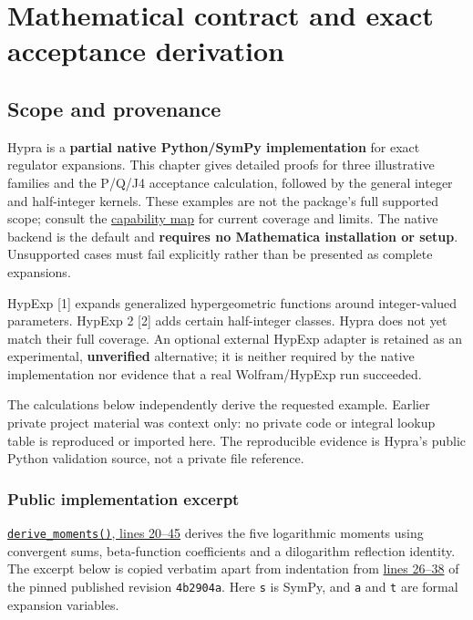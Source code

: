 \documentclass[
  11pt,
]{article}
\author{}
\date{}
\begin{document}
\section{Mathematical contract and exact acceptance
derivation}\label{mathematical-contract-and-exact-acceptance-derivation}

\subsection{Scope and provenance}\label{scope-and-provenance}

Hypra is a \textbf{partial native Python/SymPy implementation} for exact
regulator expansions. This chapter gives detailed proofs for three
illustrative families and the P/Q/J4 acceptance calculation, followed by
the general integer and half-integer kernels. These examples are not the
package's full supported scope; consult the \href{scope.md}{capability
map} for current coverage and limits. The native backend is the default
and \textbf{requires no Mathematica installation or setup}. Unsupported
cases must fail explicitly rather than be presented as complete
expansions.

HypExp {[}1{]} expands generalized hypergeometric functions around
integer-valued parameters. HypExp 2 {[}2{]} adds certain half-integer
classes. Hypra does not yet match their full coverage. An optional
external HypExp adapter is retained as an experimental,
\textbf{unverified} alternative; it is neither required by the native
implementation nor evidence that a real Wolfram/HypExp run succeeded.

The calculations below independently derive the requested example.
Earlier private project material was context only: no private code or
integral lookup table is reproduced or imported here. The reproducible
evidence is Hypra's public Python validation source, not a private file
reference.

\subsubsection{Public implementation
excerpt}\label{public-implementation-excerpt}

\href{https://github.com/lalmei/hypra/blob/4b2904aa1163f9e47f2f497cd0b9a9be5c719b59/scripts/validate_integral.py\#L20-L45}{\texttt{derive\_moments()},
lines 20--45} derives the five logarithmic moments using convergent
sums, beta-function coefficients and a dilogarithm reflection identity.
The excerpt below is copied verbatim apart from indentation from
\href{https://github.com/lalmei/hypra/blob/4b2904aa1163f9e47f2f497cd0b9a9be5c719b59/scripts/validate_integral.py\#L26-L38}{lines
26--38} of the pinned published revision \texttt{4b2904a}. Here
\texttt{s} is SymPy, and \texttt{a} and \texttt{t} are formal expansion
variables.
\end{document}
